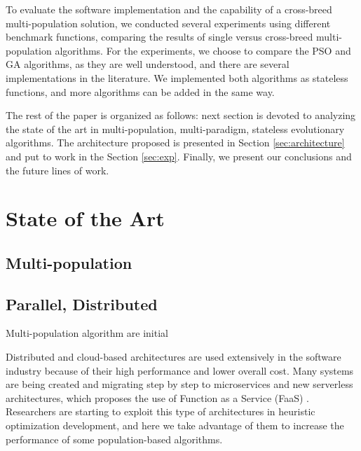 \documentclass[runningheads]{llncs}
\begin{document}

To evaluate the software implementation and the capability of a cross-breed multi-population solution,
we conducted several experiments using different benchmark functions, comparing the
results of single versus cross-breed multi-population algorithms. For the experiments, we choose to
compare the PSO and GA algorithms, as they are well understood, and there are
several implementations in the literature. We implemented both algorithms as
stateless functions, and more algorithms can be added in the same way.



The rest of the paper is organized as follows: next section is devoted
to analyzing the state of the art in multi-population, multi-paradigm,
stateless evolutionary algorithms. The architecture proposed is
presented in Section \ref{sec:architecture} and put to work in the
Section \ref{sec:exp}. Finally, we present our conclusions and the
future lines of work.

\section{State of the Art}

\subsection{Multi-population}





\subsection{Parallel, Distributed}
Multi-population algorithm are initial



Distributed and cloud-based architectures are used extensively in the software
industry because of their high performance and lower overall cost. Many systems
are being created and migrating step by step to microservices and new serverless
architectures, which proposes the use of Function as a Service (FaaS) 
\cite{Hellerstein2018,Everywhere,Baird2016}. 
Researchers are starting to exploit this type of architectures in heuristic optimization
development, and here we take advantage of them to increase the performance of
some population-based algorithms.
\end{document}
